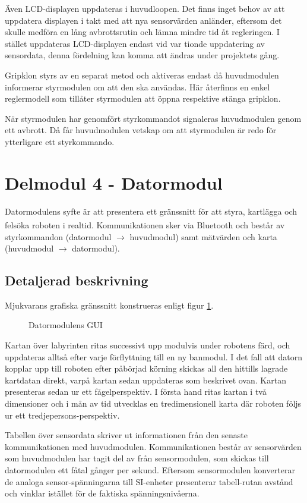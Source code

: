 \documentclass[11pt]{article}
\begin{document}
\begin{flushleft}
Även LCD-displayen uppdateras i huvudloopen. Det finns inget behov av att uppdatera displayen i takt med att nya sensorvärden anländer, eftersom det skulle medföra en lång avbrottsrutin och lämna mindre tid åt regleringen. I stället uppdateras LCD-displayen endast vid var tionde uppdatering av sensordata, denna fördelning kan komma att ändras under projektets gång. 

Gripklon styrs av en separat metod och aktiveras endast då huvudmodulen informerar styrmodulen om att den ska användas. Här återfinns en enkel reglermodell som tillåter styrmodulen att öppna respektive stänga gripklon. 

När styrmodulen har genomfört styrkommandot signaleras huvudmodulen genom ett avbrott. Då får huvudmodulen vetskap om att styrmodulen är redo för ytterligare ett styrkommando. 

\pagebreak
\section{Delmodul 4 - Datormodul}
Datormodulens syfte är att presentera ett gränssnitt för att styra, kartlägga och felsöka roboten i realtid. Kommunikationen sker via Bluetooth\textsuperscript{\circledR} och består av styrkommandon (datormodul $\rightarrow$ huvudmodul) samt mätvärden och karta (huvudmodul $\rightarrow$ datormodul). 

\subsection{Detaljerad beskrivning}
Mjukvarans grafiska gränssnitt konstrueras enligt figur \ref{datormodul:software}.

\begin{figure}[htbp]
\centering
\noindent\resizebox{.5\linewidth}{!}{
	}
	\caption{Datormodulens GUI \label{datormodul:software}}	
\end{figure}

Kartan över labyrinten ritas successivt upp modulvis under robotens färd, och uppdateras alltså efter varje förflyttning till en ny banmodul. I det fall att datorn kopplar upp till roboten efter påbörjad körning skickas all den hittills lagrade kartdatan direkt, varpå kartan sedan uppdateras som beskrivet ovan. Kartan presenteras sedan ur ett fågelperspektiv. I första hand ritas kartan i två dimensioner och i mån av tid utvecklas en tredimensionell karta där roboten följs ur ett tredjepersons-perspektiv. 

Tabellen över sensordata skriver ut informationen från den senaste kommunikationen med huvudmodulen. Kommunikationen består av sensorvärden som huvudmodulen har tagit del av från sensormodulen, som skickas till datormodulen ett fåtal gånger per sekund. Eftersom sensormodulen konverterar de analoga sensor-spänningarna till SI-enheter presenterar tabell-rutan avstånd och vinklar istället för de faktiska spänningsnivåerna. 


\end{flushleft}
\end{document}
